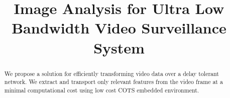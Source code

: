 \documentclass[conference]{IEEEtran}
\begin{document}
%
%
\title{Image Analysis for Ultra Low Bandwidth Video Surveillance System}


\author{
}


% 








\maketitle


\begin{abstract}
We propose a solution for efficiently transforming video data over a
delay tolerant network. We extract and transport only relevant features
from the video frame at a minimal computational cost using low cost COTS
embedded environment.
\end{abstract}
\end{document}
